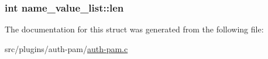 \subsubsection[{len}]{\setlength{\rightskip}{0pt plus 5cm}int name\+\_\+value\+\_\+list\+::len}\label{structname__value__list_a4dd90bbb2e805da1ce32638236a0143c}


The documentation for this struct was generated from the following file\+:\begin{DoxyCompactItemize}
\item 
src/plugins/auth-\/pam/\hyperlink{auth-pam_8c}{auth-\/pam.\+c}\end{DoxyCompactItemize}
